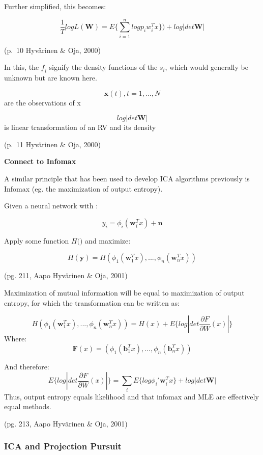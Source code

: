 \documentclass[12pt,twoside]{amherstthesis}
\begin{document}
  Further simplified, this becomes:
  
  \[ \frac{1}{T} log L(\textbf{W}) = E\{\sum_{i=1}^n log p_i w_i^Tx\}) + log|det \textbf{W}|\]
  
  (p.~10 Hyvärinen \& Oja, 2000)
  
  In this, the \(\textit{f}_i\) signify the density functions of the
  \(s_i\), which would generally be unknown but are known here.
  
  \[ \textbf{x}(t), t= 1,...,N\] are the observations of x
  
  \[ log|det\textbf{W}|\] is linear transformation of an RV and its
  density
  
  (p.~11 Hyvärinen \& Oja, 2000) \newline
  
  \textbf{Connect to Infomax}
  
  A similar principle that has been used to develop ICA algorithms
  previously is Infomax (eg. the maximization of output entropy).
  
  Given a neural network with :
  
  \[ \textit{y}_i = \phi_i(\textbf{w}_i^Tx)+\textbf{n}\]
  
  Apply some function \(\textit{H()}\) and maximize:
  
  \[\textit{H}(\textbf{y}) = \textit{H}(\phi_1(\textbf{w}_1^Tx),...,\phi_n(\textbf{w}_n^Tx))\]
  
  (pg. 211, Aapo Hyvärinen \& Oja, 2001) \newline
  
  Maximization of mutual information will be equal to maximization of
  output entropy, for which the transformation can be written as:
  
  \[\textit{H}(\phi_1(\textbf{w}_1^Tx),...,\phi_n(\textbf{w}_n^Tx)) =\textit{H}(x)+\textit{E}\{log | det \frac{\partial F}{\partial W}(x)|\}\]
  Where:
  \[\textbf{F}(x) = (\phi_1(\textbf{b}_1^Tx),...,\phi_n(\textbf{b}_n^Tx))\]
  
  And therefore:
  \[\textit{E}\{log | det \frac{\partial F}{\partial W}(x)|\} = \sum_{i} \textit{E}\{log \phi_i' \textbf{w}_i^Tx\} + log|det\textbf{W}|\]
  Thus, output entropy equals likelihood and that infomax and MLE are
  effectively equal methods.
  
  (pg. 213, Aapo Hyvärinen \& Oja, 2001)
  
  \subsubsection{ICA and Projection
  Pursuit}\label{ica-and-projection-pursuit}
  
\end{document}
